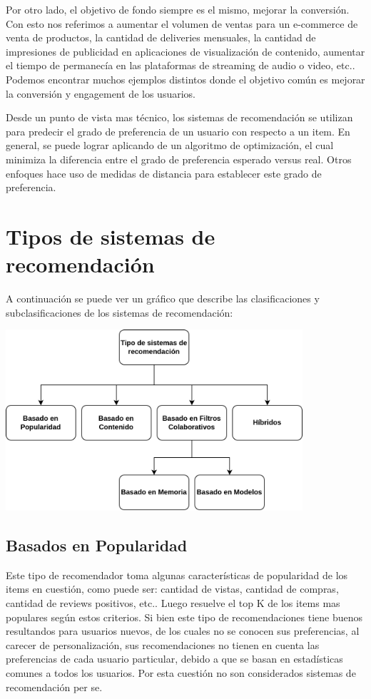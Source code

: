 \documentclass[11pt,a4paper,twoside]{thesis}
\begin{document}
Por otro lado, el objetivo de fondo siempre es el mismo, mejorar la conversión. Con esto nos referimos a aumentar el volumen de ventas para un e-commerce de venta de productos, la cantidad de deliveries mensuales, la cantidad de impresiones de publicidad  en aplicaciones de visualización de contenido, aumentar el tiempo de permanecía en las plataformas de streaming de audio o video, etc.. Podemos encontrar muchos ejemplos distintos donde el objetivo común es mejorar la conversión y engagement de los usuarios.

Desde un punto de vista mas técnico, los sistemas de recomendación se utilizan para predecir el grado de preferencia de un usuario con respecto a un item. 
En general, se puede lograr aplicando de un algoritmo de optimización, el cual minimiza la diferencia entre el grado de preferencia esperado versus real. Otros enfoques hace uso de medidas de distancia para establecer este grado de preferencia.

\section{Tipos de sistemas de recomendación}

A continuación se puede ver un gráfico que describe las clasificaciones y subclasificaciones de los sistemas de recomendación:

\begin{center}
\includegraphics[width=11cm]{./images/reco-clasification.png}
\end{center}

\subsection{Basados en Popularidad} 

Este tipo de recomendador toma algunas características de popularidad de los items en cuestión, como puede ser: cantidad de vistas, cantidad de compras, cantidad de reviews positivos, etc.. Luego resuelve el top K de  los items mas populares según estos criterios. Si bien este tipo de recomendaciones tiene buenos resultandos para usuarios nuevos, de los cuales no se conocen sus preferencias, al carecer de personalización, sus recomendaciones no tienen en cuenta las preferencias de cada usuario particular, debido a que se basan en estadísticas comunes a todos los usuarios. Por esta cuestión no son considerados sistemas de recomendación per se.
\end{document}
